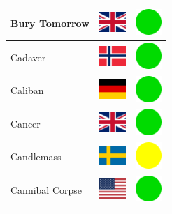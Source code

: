\documentclass[12pt, a4paper, twoside]{report}
\begin{document}
\begin{center}
\begin{longtable}{|p{5cm}|p{2cm}|p{2cm}|}
Bury Tomorrow & \includegraphics[width=1cm]{4x3/gb} & \includegraphics[width=1cm]{likes/y} \\ \hline
Cadaver & \includegraphics[width=1cm]{4x3/no} & \includegraphics[width=1cm]{likes/y} \\ \hline
Caliban & \includegraphics[width=1cm]{4x3/de} & \includegraphics[width=1cm]{likes/y} \\ \hline
Cancer & \includegraphics[width=1cm]{4x3/gb} & \includegraphics[width=1cm]{likes/y} \\ \hline
Candlemass & \includegraphics[width=1cm]{4x3/se} & \includegraphics[width=1cm]{likes/m} \\ \hline
Cannibal Corpse & \includegraphics[width=1cm]{4x3/us} & \includegraphics[width=1cm]{likes/y} \\ \hline

\end{longtable}
\end{center}
\end{document}
